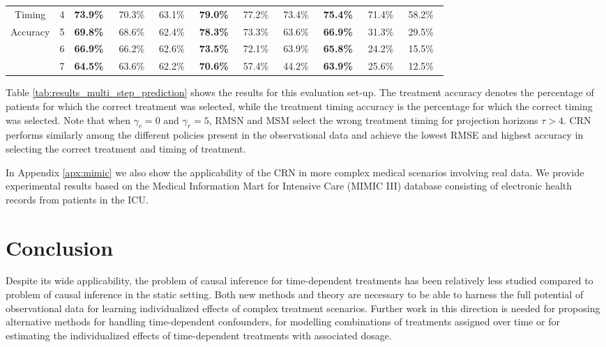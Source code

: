 \documentclass{article} %
\begin{document}
\begin{table}[t]
\begin{tabular}{c|c|ccc|ccc|ccc}
			Timing  	& 4 & \textbf{73.9\%~} & 70.3\%~ & 63.1\%~ &\textbf{79.0\%}~ & 77.2\%~ & 73.4\%~ & \textbf{75.4\%~} & 71.4\%~ & 58.2\%~ \\
			Accuracy	& 5 & \textbf{69.8\%~} & 68.6\%~ & 62.4\%~ & \textbf{78.3\%}~ & 73.3\%~ & 63.6\%~ & \textbf{66.9\%~} & 31.3\%~ & 29.5\%~ \\
			& 6 & \textbf{66.9\%~} & 66.2\%~ & 62.6\%~ & \textbf{73.5\%}~ & 72.1\%~ & 63.9\%~ & \textbf{65.8\%~} & 24.2\%~ & 15.5\%~ \\
			& 7 & \textbf{64.5\%~} & 63.6\%~ & 62.2\%~ & \textbf{70.6\%}~ & 57.4\%~ & 44.2\%~ & \textbf{63.9\%~} & 25.6\%~ & 12.5\%~ \\
			\bottomrule
		\end{tabular}
	\vspace{-0.3cm}
	\end{table}

	
	
	Table \ref{tab:results_multi_step_prediction} shows the results for this evaluation set-up. The treatment accuracy denotes the percentage of patients for which the correct treatment was selected, while the treatment timing accuracy is the percentage for which the correct timing was selected. Note that when $\gamma_c=0$ and $\gamma_r=5$, RMSN and MSM select the wrong treatment timing for projection horizons $\tau > 4$. CRN performs similarly among the different policies present in the observational data and achieve the lowest RMSE and highest accuracy in selecting the correct treatment and timing of treatment.
	
	
    In Appendix \ref{apx:mimic} we also show the applicability of the CRN in more complex medical scenarios involving real data. We provide experimental results based on the Medical Information Mart for Intensive Care (MIMIC III) database \citep{johnson2016mimic} consisting of electronic health records from patients in the ICU. 

	
	\section{Conclusion}
	
    Despite its wide applicability, the problem of causal inference for time-dependent treatments has been relatively less studied compared to problem of causal inference in the static setting. Both new methods and theory are necessary to be able to harness the full potential of observational data for learning individualized effects of complex treatment scenarios. Further work in this direction is needed for proposing alternative methods for handling time-dependent confounders, for modelling combinations of treatments assigned over time or for  estimating the individualized effects of time-dependent treatments with associated dosage. 
\end{document}
